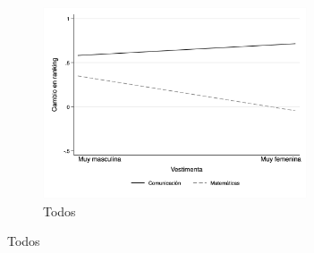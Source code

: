 \begin{figure}[t!]
    \centering
    \label{fig:hypothesis_graphs}
    \caption{Ranking esperado por combinación de expresiones de género}
    \begin{minipage}{0.245\textwidth}
        
    \end{minipage}
    \begin{subfigure}{0.49\textwidth}
        \centering
        \caption{Todos}
        \includegraphics[width=7.8cm]{Images/h1_predicted_rank_score.png}
    \end{subfigure}
    \begin{minipage}{0.245\textwidth}
        

\end{minipage}
\end{figure}
